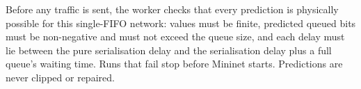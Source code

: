 Before any traffic is sent, the worker checks that every prediction is physically possible for this single-FIFO network: values must be finite, predicted queued bits must be non-negative and must not exceed the queue size, and each delay must lie between the pure serialisation delay and the serialisation delay plus a full queue's waiting time. Runs that fail stop before Mininet starts. Predictions are never clipped or repaired.
